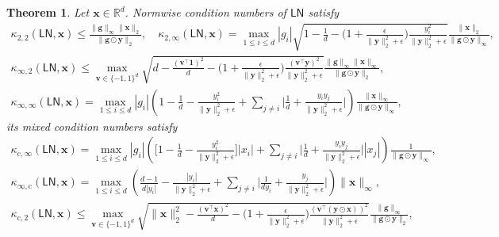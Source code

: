 \documentclass[namedate,webpdf,imanum]{ima-authoring-template}
\newcommand{\Real}{\mathbb{R}}
\newcommand{\Matrix}[1]{\mathbf{#1}}
\newcommand{\trans}{\intercal}
\newcommand{\Norm}[3][]{#1\| #2 #1\|_{\mathrm{#3}}}
\newcommand{\hap}{\mathbin{\odot}}
\newcommand{\One}{\Matrix{1}}
\newcommand{\Layer}[1]{\mathsf{#1}}
\newcommand{\cond}[3][]{\kappa_{\mathrm{#2}} #1( #3 #1)}
\newtheorem{theorem}{Theorem}[section]%
\numberwithin{equation}{section}
\begin{document}
\begin{theorem}
\label{theorem:cond-layernorm}
Let $\Matrix{x} \in \Real^d$.
Normwise condition numbers of $\Layer{LN}$ satisfy
\begin{gather*}
    \cond{2,2}{\Layer{LN}, \Matrix{x}} \leq \frac{\Norm{\Matrix{g}}{\infty} \Norm{\Matrix{x}}{2}}{\Norm{\Matrix{g} \hap \Matrix{y}}{2}}, \quad
    \cond{2,\infty}{\Layer{LN}, \Matrix{x}} = \max_{1 \leq i \leq d} |g_i| \sqrt{1 - \frac{1}{d} - \bigg( 1 + \frac{\epsilon}{\Norm{\Matrix{y}}{2}^2 + \epsilon} \bigg) \frac{y_i^2}{\Norm{\Matrix{y}}{2}^2 + \epsilon}} \frac{\Norm{\Matrix{x}}{2}}{\Norm{\Matrix{g} \hap \Matrix{y}}{\infty}}, \\
    \cond{\infty,2}{\Layer{LN}, \Matrix{x}} \leq \max_{\Matrix{v} \in \{ -1,1 \}^d} \sqrt{d - \frac{(\Matrix{v}^\trans \One)^2}{d} - \bigg( 1 + \frac{\epsilon}{\Norm{\Matrix{y}}{2}^2 + \epsilon} \bigg) \frac{(\Matrix{v}^\trans \Matrix{y})^2}{\Norm{\Matrix{y}}{2}^2 + \epsilon}} \frac{\Norm{\Matrix{g}}{\infty} \Norm{\Matrix{x}}{\infty}}{\Norm{\Matrix{g} \hap \Matrix{y}}{2}}, \\
    \cond{\infty,\infty}{\Layer{LN}, \Matrix{x}} = \max_{1 \leq i \leq d} |g_i| \left(  1 - \frac{1}{d} - \frac{y_i^2}{\Norm{\Matrix{y}}{2}^2 + \epsilon} + \sum_{j \neq i} \bigg|\frac{1}{d} + \frac{y_i y_j}{\Norm{\Matrix{y}}{2}^2 + \epsilon} \bigg| \right) \frac{\Norm{\Matrix{x}}{\infty}}{\Norm{\Matrix{g} \hap \Matrix{y}}{\infty}},
\end{gather*}
its mixed condition numbers satisfy
\begin{gather*}
    \cond{c,\infty}{\Layer{LN}, \Matrix{x}} = \max_{1 \leq i \leq d} |g_i| \left(  \bigg[1 - \frac{1}{d} - \frac{y_i^2}{\Norm{\Matrix{y}}{2}^2 + \epsilon} \bigg] |x_i| + \sum_{j \neq i} \bigg|\frac{1}{d} + \frac{y_i y_j}{\Norm{\Matrix{y}}{2}^2 + \epsilon} \bigg| |x_j| \right) \frac{1}{\Norm{\Matrix{g} \hap \Matrix{y}}{\infty}}, \\
    \cond{\infty,c}{\Layer{LN}, \Matrix{x}} = \max_{1 \leq i \leq d} \left( \frac{d-1}{d |y_i|} - \frac{|y_i|}{\Norm{\Matrix{y}}{2}^2 + \epsilon} + \sum_{j \neq i} \bigg|\frac{1}{d y_i} + \frac{y_j}{\Norm{\Matrix{y}}{2}^2 + \epsilon} \bigg| \right) \Norm{\Matrix{x}}{\infty}, \\
    \cond{c,2}{\Layer{LN}, \Matrix{x}} \leq \max_{\Matrix{v} \in \{ -1,1 \}^d} \sqrt{\Norm{\Matrix{x}}{2}^2 - \frac{(\Matrix{v}^\trans \Matrix{x})^2}{d} - \bigg( 1 + \frac{\epsilon}{\Norm{\Matrix{y}}{2}^2 + \epsilon} \bigg) \frac{(\Matrix{v}^\trans (\Matrix{y} \hap \Matrix{x}))^2}{\Norm{\Matrix{y}}{2}^2 + \epsilon}} \frac{\Norm{\Matrix{g}}{\infty}}{\Norm{\Matrix{g} \hap \Matrix{y}}{2}}, \\

\end{gather*}
\end{theorem}
\end{document}
